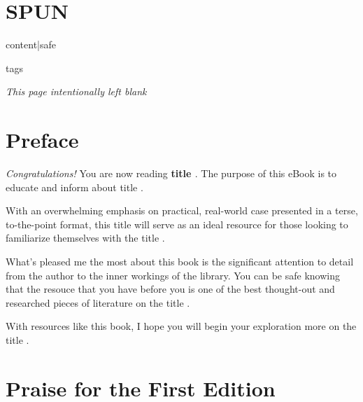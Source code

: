 \documentclass{article}
\begin{document}
\clearpage


\section*{SPUN}

{\normalsize
  {{ content|safe }}
}

\clearpage

{{ tags }}

\clearpage

\noindent
\begin{center}
{\normalsize \emph{This page intentionally left blank}}
\end{center}

\clearpage

\section*{Preface}
{\normalsize
\begin{flushleft}
\emph{Congratulations!} You are now reading \textbf{ {{ title }} }. The
purpose of this eBook is to educate and inform about {{ title }}.
\end{flushleft}

\begin{flushleft}
With an overwhelming emphasis on practical, real-world case presented
in a terse, to-the-point format, this {{ title }} will serve as an
ideal resource for those looking to familiarize themselves with the 
{{ title }}.
\end{flushleft}

\begin{flushleft}
What's pleased me the most about this book is the significant
attention to detail from the author to the inner workings of the
library. You can be safe knowing that the resouce that you have before
you is one of the best thought-out and researched pieces of literature
on the {{ title }}.
\end{flushleft}

\begin{flushleft}
With resources like this book, I hope you will begin your exploration
more on the {{ title }}.
\end{flushleft}
}

\clearpage

\section*{Praise for the First Edition}
\end{document}
